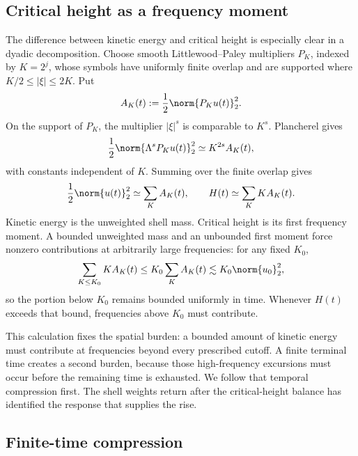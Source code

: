 \subsection{Critical height as a frequency moment}

The difference between kinetic energy and critical height is especially clear
in a dyadic decomposition.  Choose smooth Littlewood--Paley multipliers
\(P_K\), indexed by \(K=2^j\), whose symbols have uniformly finite overlap and
are supported where \(K/2\le |\xi|\le2K\).  Put
\begin{equation*}
 A_K(t):=\frac12\norm{P_Ku(t)}_2^2.
\end{equation*}
On the support of \(P_K\), the multiplier \(|\xi|^s\) is comparable to
\(K^s\).  Plancherel gives
\begin{equation*}
 \frac12\norm{\Lambda^sP_Ku(t)}_2^2
 \simeq K^{2s}A_K(t),
\end{equation*}
with constants independent of \(K\).  Summing over the finite overlap gives
\begin{equation*}
 \frac12\norm{u(t)}_2^2\simeq\sum_KA_K(t),
 \qquad
 H(t)\simeq\sum_KK A_K(t).
\end{equation*}
Kinetic energy is the unweighted shell mass.  Critical height is its first
frequency moment.  A bounded unweighted mass and an unbounded first moment
force nonzero contributions at arbitrarily large frequencies: for any fixed
\(K_0\),
\begin{equation*}
 \sum_{K\le K_0}K A_K(t)
 \le K_0\sum_KA_K(t)
 \lesssim K_0\norm{u_0}_2^2,
\end{equation*}
so the portion below \(K_0\) remains bounded uniformly in time.  Whenever
\(H(t)\) exceeds that bound, frequencies above \(K_0\) must contribute.

This calculation fixes the spatial burden: a bounded amount of kinetic energy
must contribute at frequencies beyond every prescribed cutoff.  A finite
terminal time creates a second burden, because those high-frequency
excursions must occur before the remaining time is exhausted.  We follow that
temporal compression first.  The shell weights return after the
critical-height balance has identified the response that supplies the rise.

\subsection{Finite-time compression}

